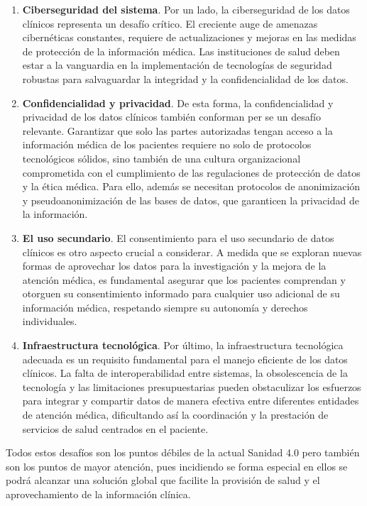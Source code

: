 \begin{enumerate}[label=\roman*.]
    \item \textbf{Ciberseguridad del sistema}. Por un lado, la ciberseguridad de los datos clínicos representa un desafío crítico. El creciente auge de amenazas cibernéticas constantes, requiere de actualizaciones y mejoras en las medidas de protección de la información médica. Las instituciones de salud deben estar a la vanguardia en la implementación de tecnologías de seguridad robustas para salvaguardar la integridad y la confidencialidad de los datos.
    \item \textbf{Confidencialidad y privacidad}. De esta forma, la confidencialidad y privacidad de los datos clínicos también conforman per se un desafío relevante. Garantizar que solo las partes autorizadas tengan acceso a la información médica de los pacientes requiere no solo de protocolos tecnológicos sólidos, sino también de una cultura organizacional comprometida con el cumplimiento de las regulaciones de protección de datos y la ética médica. Para ello, además se necesitan protocolos de anonimización y pseudoanonimización de las bases de datos, que garanticen la privacidad de la información.
    \item \textbf{El uso secundario}. El consentimiento para el uso secundario de datos clínicos es otro aspecto crucial a considerar. A medida que se exploran nuevas formas de aprovechar los datos para la investigación y la mejora de la atención médica, es fundamental asegurar que los pacientes comprendan y otorguen su consentimiento informado para cualquier uso adicional de su información médica, respetando siempre su autonomía y derechos individuales.
    \item \textbf{Infraestructura tecnológica}. Por último, la infraestructura tecnológica adecuada es un requisito fundamental para el manejo eficiente de los datos clínicos. La falta de interoperabilidad entre sistemas, la obsolescencia de la tecnología y las limitaciones presupuestarias pueden obstaculizar los esfuerzos para integrar y compartir datos de manera efectiva entre diferentes entidades de atención médica, dificultando así la coordinación y la prestación de servicios de salud centrados en el paciente.
    
\end{enumerate}

Todos estos desafíos son los puntos débiles de la actual Sanidad 4.0 pero también son los puntos de mayor atención, pues incidiendo se forma especial en ellos se podrá alcanzar una solución global que facilite la provisión de salud y el aprovechamiento de la información clínica.

